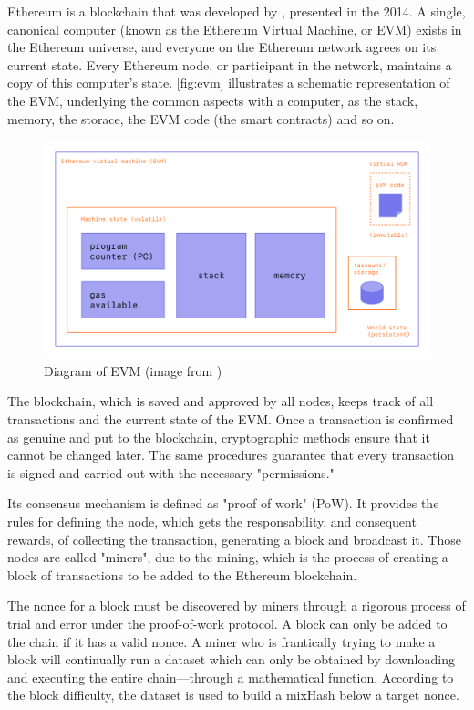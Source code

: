Ethereum is a blockchain that was developed by \citet{Ethereum}, presented in the 2014. 
A single, canonical computer (known as the Ethereum Virtual Machine, or EVM) exists in the Ethereum universe, and everyone on the Ethereum network agrees on its current state.
Every Ethereum node, or participant in the network, maintains a copy of this computer's state. 
\autoref{fig:evm} illustrates a schematic representation of the EVM, underlying the common aspects with a computer, as the stack, memory, the storace, the EVM code (the smart contracts) and so on.


\begin{figure}
    \centering
    \includegraphics[width=13cm]{logos/evm.png}
    \caption{Diagram of EVM (image from \cite{EthDocs})}
    \label{fig:evm}
\end{figure}

The blockchain, which is saved and approved by all nodes, keeps track of all transactions and the current state of the EVM. 
Once a transaction is confirmed as genuine and put to the blockchain, cryptographic methods ensure that it cannot be changed later.
The same procedures guarantee that every transaction is signed and carried out with the necessary "permissions." 

Its consensus mechanism is defined as "proof of work" (PoW). 
It provides the rules for defining the node, which gets the responsability, and consequent rewards, of collecting the 
transaction, generating a block and broadcast it. 
Those nodes are called "miners", due to the mining, which is the process of creating a block of transactions to be added to the Ethereum blockchain. 

The nonce for a block must be discovered by miners through a rigorous process of trial and error under the proof-of-work protocol.
A block can only be added to the chain if it has a valid nonce. 
A miner who is frantically trying to make a block will continually run a dataset which can only be obtained by downloading and executing the entire chain—through a mathematical function.
According to the block difficulty, the dataset is used to build a mixHash below a target nonce.

